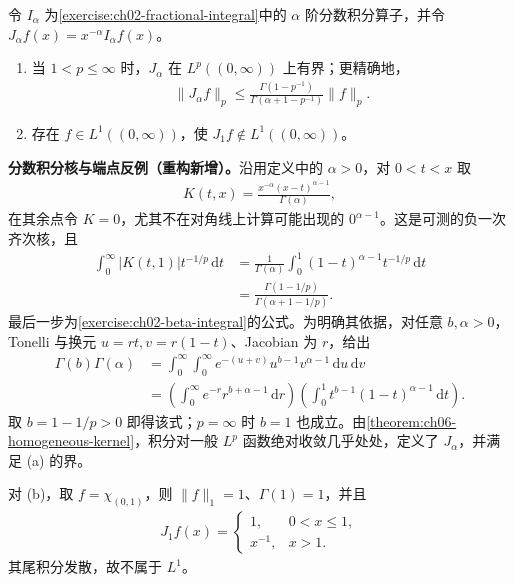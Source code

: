 \documentclass[../../main.tex]{subfiles}
\begin{document}
\begin{exercise}\label{exercise:ch06-fractional-hardy}
令 $I_\alpha$ 为\cref{exercise:ch02-fractional-integral}中的 $\alpha$ 阶分数积分算子，并令 $J_\alpha f(x)=x^{-\alpha}I_\alpha f(x)$。
\begin{enumerate}
\item\label{item:ch06-fractional-hardy-bound} 当 $1<p\leqslant\infty$ 时，$J_\alpha$ 在 $L^p((0,\infty))$ 上有界；更精确地，
\begin{align*}
\|J_\alpha f\|_p\leqslant\frac{\Gamma(1-p^{-1})}{\Gamma(\alpha+1-p^{-1})}\|f\|_p.
\end{align*}
\item\label{item:ch06-fractional-hardy-endpoint} 存在 $f\in L^1((0,\infty))$，使 $J_1f\notin L^1((0,\infty))$。
\end{enumerate}
\end{exercise}
\begin{solution}
\textbf{分数积分核与端点反例（重构新增）。}沿用定义中的 $\alpha>0$，对 $0<t<x$ 取
\begin{align*}
K(t,x)=\frac{x^{-\alpha}(x-t)^{\alpha-1}}{\Gamma(\alpha)},
\end{align*}
在其余点令 $K=0$，尤其不在对角线上计算可能出现的 $0^{\alpha-1}$。这是可测的负一次齐次核，且
\begin{align*}
\int_0^\infty|K(t,1)|t^{-1/p}\,\mathrm dt
&=\frac1{\Gamma(\alpha)}\int_0^1(1-t)^{\alpha-1}t^{-1/p}\,\mathrm dt\\
&=\frac{\Gamma(1-1/p)}{\Gamma(\alpha+1-1/p)}.
\end{align*}
最后一步为\cref{exercise:ch02-beta-integral}的公式。为明确其依据，对任意 $b,\alpha>0$，Tonelli 与换元 $u=rt,v=r(1-t)$、Jacobian 为 $r$，给出
\begin{align*}
\Gamma(b)\Gamma(\alpha)
&=\int_0^\infty\int_0^\infty e^{-(u+v)}u^{b-1}v^{\alpha-1}\,\mathrm du\,\mathrm dv\\
&=\left(\int_0^\infty e^{-r}r^{b+\alpha-1}\,\mathrm dr\right)
\left(\int_0^1t^{b-1}(1-t)^{\alpha-1}\,\mathrm dt\right).
\end{align*}
取 $b=1-1/p>0$ 即得该式；$p=\infty$ 时 $b=1$ 也成立。由\cref{theorem:ch06-homogeneous-kernel}，积分对一般 $L^p$ 函数绝对收敛几乎处处，定义了 $J_\alpha$，并满足 (a) 的界。

对 (b)，取 $f=\chi_{(0,1)}$，则 $\|f\|_1=1$、$\Gamma(1)=1$，并且
\begin{align*}
J_1f(x)=\begin{cases}1,&0<x\leqslant1,\\x^{-1},&x>1.\end{cases}
\end{align*}
其尾积分发散，故不属于 $L^1$。
\end{solution}
\end{document}
